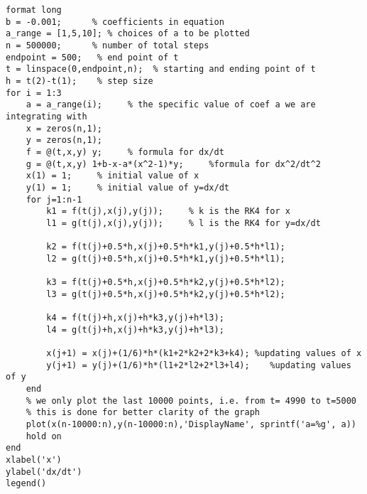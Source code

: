 \lstset{basicstyle=\footnotesize,style=myCustomMatlabStyle}
\begin{lstlisting}
format long
b = -0.001;      % coefficients in equation
a_range = [1,5,10]; % choices of a to be plotted
n = 500000;      % number of total steps
endpoint = 500;   % end point of t 
t = linspace(0,endpoint,n);  % starting and ending point of t
h = t(2)-t(1);    % step size
for i = 1:3
    a = a_range(i);     % the specific value of coef a we are integrating with
    x = zeros(n,1);
    y = zeros(n,1);
    f = @(t,x,y) y;     % formula for dx/dt
    g = @(t,x,y) 1+b-x-a*(x^2-1)*y;     %formula for dx^2/dt^2
    x(1) = 1;     % initial value of x
    y(1) = 1;     % initial value of y=dx/dt
    for j=1:n-1
        k1 = f(t(j),x(j),y(j));     % k is the RK4 for x
        l1 = g(t(j),x(j),y(j));     % l is the RK4 for y=dx/dt

        k2 = f(t(j)+0.5*h,x(j)+0.5*h*k1,y(j)+0.5*h*l1);
        l2 = g(t(j)+0.5*h,x(j)+0.5*h*k1,y(j)+0.5*h*l1);

        k3 = f(t(j)+0.5*h,x(j)+0.5*h*k2,y(j)+0.5*h*l2);
        l3 = g(t(j)+0.5*h,x(j)+0.5*h*k2,y(j)+0.5*h*l2);

        k4 = f(t(j)+h,x(j)+h*k3,y(j)+h*l3);
        l4 = g(t(j)+h,x(j)+h*k3,y(j)+h*l3);

        x(j+1) = x(j)+(1/6)*h*(k1+2*k2+2*k3+k4); %updating values of x
        y(j+1) = y(j)+(1/6)*h*(l1+2*l2+2*l3+l4);    %updating values of y
    end
    % we only plot the last 10000 points, i.e. from t= 4990 to t=5000
    % this is done for better clarity of the graph
    plot(x(n-10000:n),y(n-10000:n),'DisplayName', sprintf('a=%g', a))
    hold on
end
xlabel('x')
ylabel('dx/dt')
legend()

\end{lstlisting}